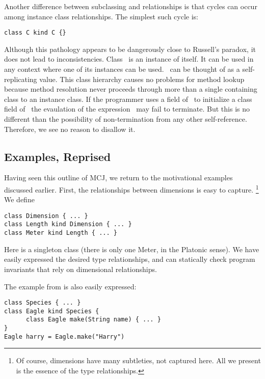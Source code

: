 \documentclass{acm-sigplan}
\begin{document}
Another difference between subclassing and {}
relationships is that cycles can occur among instance class
relationships. The simplest such cycle is:

\begin{verbatim}
class C kind C {}
\end{verbatim}

Although this pathology appears to be dangerously close to Russell's
paradox, it does not lead to inconsistencies.  Class \C\ is an
instance of itself. It can be used in any context where one of its
instances can be used.  \C\ can be thought of as a self-replicating
value. This class hierarchy causes no problems for method lookup
because method resolution never proceeds through more than a single
containing class to an instance class. If the programmer uses a field
of \C\ to initialize a class field of \C\, the evaulation of the
expression \C\ may fail to terminate.  But this is no different than
the possibility of non-termination from any other self-reference.
Therefore, we see no reason to disallow it.


\subsection{Examples, Reprised}

\label{examples}

Having seen this outline of MCJ, we return to the motivational
examples discussed earlier.  First, the relationships between
dimensions is easy to capture. \footnote{Of course, dimensions have
many subtleties, not captured here.  All we present is the essence of
the type relationships.} We define 

\begin{verbatim}
class Dimension { ... }
class Length kind Dimension { ... }
class Meter kind Length { ... }
\end{verbatim}

Here {} is a singleton class (there is only one Meter, in
the Platonic sense).  We have easily expressed the desired type
relationships, and can statically check program invariants that rely
on dimensional relationships.

The example from \cite{FW96} is also easily expressed:

\begin{verbatim}
class Species { ... }
class Eagle kind Species {
      class Eagle make(String name) { ... }
}
Eagle harry = Eagle.make("Harry")
\end{verbatim}
\end{document}
